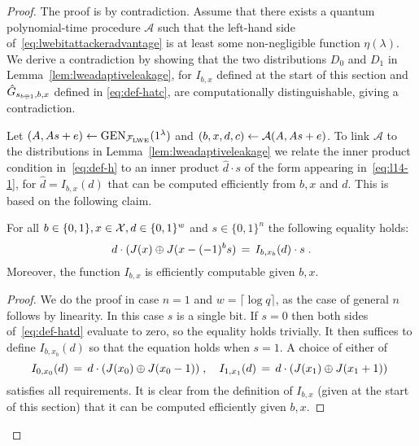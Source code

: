 \begin{proof}
The proof is by contradiction. Assume that there exists a quantum polynomial-time procedure $\mathcal{A}$ such that the left-hand side of~\eqref{eq:lwebitattackeradvantage} is at least some non-negligible function $\eta(\lambda)$. We derive a contradiction by showing that the two distributions ${D}_0$ and ${D}_1$ in Lemma~\ref{lem:lweadaptiveleakage}, for $I_{b,x}$ defined at the start of this section and $\hat{G}_{s_{b\oplus 1},b,x}$ defined in \eqref{eq:def-hatc}, are computationally distinguishable, giving a contradiction. 

Let $(\*A,\*A\*s+\*e) \leftarrow \textrm{GEN}_{\mathcal{F}_{\lwe}}(1^{\lambda})$ and $(b,x,d,c) \leftarrow \mathcal{A}(\*A,\*A\*s+\*e)$. To link $\mathcal{A}$ to the distributions in Lemma~\ref{lem:lweadaptiveleakage} we relate the inner product condition in~\eqref{eq:def-h} to an inner product $\hat{d} \cdot s$ of the form appearing in~\eqref{eq:l14-1}, for $\hat{d} = I_{b,x}(d)$ that can be computed efficiently from $b,x$ and $d$. This is based on the following claim. 


\begin{claim}\label{cl:dependenceonsecret}
For all $b\in\{0,1\},x\in \mathcal{X}, d\in\{0,1\}^w$ and $s\in\{0,1\}^n$ the following equality holds:
\begin{equation}\label{eq:def-hatd}
d\cdot(\inj(x)\oplus \inj( x - (-1)^b \*s ) \,=\,  I_{b,x_b}(d)\cdot s \;.
\end{equation}
Moreover, the function $I_{b,x}$ is efficiently computable given $b,x$. 
\end{claim}

\begin{proof}
We do the proof in case $n=1$ and $w=\lceil\log q\rceil$, as the case of general $n$ follows by linearity. In this case $s$ is a single bit. If $s=0$ then both sides of~\eqref{eq:def-hatd} evaluate to zero, so the equality holds trivially. It then suffices to define $ I_{b,x_b}(d)$ so that the equation holds when $s=1$. A choice of either of
\begin{equation}\label{eq:def-hatd-1}
I_{0,x_0}(d)\,=\, d \cdot (\inj(x_0) \oplus \inj(x_0 -\*1))\;,\quad  I_{1,x_1}(d)\,=\,d \cdot (\inj(x_1) \oplus \inj(x_1 +\*1 ))\;
\end{equation}
satisfies all requirements. It is clear from the definition of $I_{b,x}$ (given at the start of this section) that it can be computed efficiently given $b,x$.  
\end{proof}


\end{proof}
